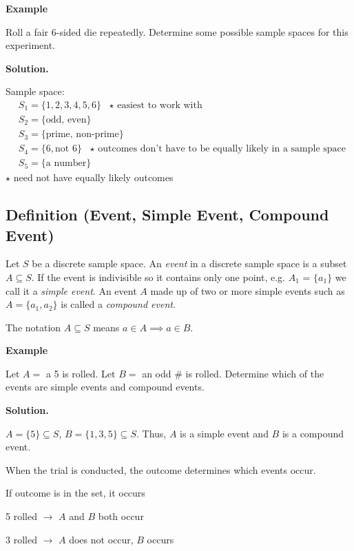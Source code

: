 \textbf{Example}

Roll a fair 6-sided die repeatedly. Determine some possible sample spaces
for this experiment.

\textbf{Solution.}

Sample space:
\begin{align*}
    &S_1=\{1,2,3,4,5,6\} \text{ $\star$ easiest to work with}\\
    &S_2=\{\text{odd, even}\}\\
    &S_3=\{\text{prime, non-prime}\}\\
    &S_4=\{6, \text{not } 6\}\text{ $\star$ outcomes don't have to be equally likely
    in a sample space}\\
    &S_5=\{\text{a number}\}
\end{align*}
$\star$ need not have equally likely outcomes

\begin{defbox}
    \subsection{Definition (Event, Simple Event, Compound Event)}
    Let $ S $ be a discrete sample space. An \emph{event} in a discrete
    sample space is a subset $ A\subseteq S $. If the event is indivisible so it
    contains only one point, e.g. $A_1$ = $ \{a_1\} $ we call it a \emph{simple event}.
    An event $A$ made up of two or more simple events
    such as $ A=\{a_1,a_2\} $ is called a \emph{compound event}.
\end{defbox}
\begin{remark}
    The notation $ A\subseteq S $ means $ a\in A \implies a\in B $.
\end{remark}

\textbf{Example}

Let $ A= $ a 5 is rolled. Let $ B= $ an odd \# is rolled. Determine which of
the events are simple events and compound events.

\textbf{Solution.}

$ A=\{5\}\subseteq S $, $ B=\{1,3,5\}\subseteq S $. Thus,
$ A $ is a simple event and $ B $ is a compound event.

When the trial is conducted, the outcome determines which events
occur.

If outcome is in the set, it occurs

5 rolled $ \rightarrow $ $ A $ and $ B $ both occur

3 rolled $ \rightarrow $ $ A $ does not occur, $ B $ occurs

